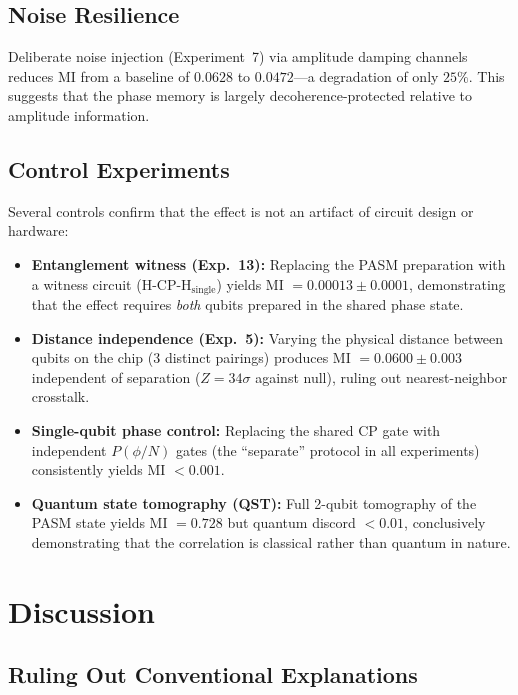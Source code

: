 ﻿\documentclass[12pt,a4paper]{article}
\begin{document}
\subsection{Noise Resilience}

Deliberate noise injection (Experiment~7) via amplitude damping channels reduces MI from a baseline of $0.0628$ to $0.0472$---a degradation of only $25\%$. This suggests that the phase memory is largely decoherence-protected relative to amplitude information.

\subsection{Control Experiments}

Several controls confirm that the effect is not an artifact of circuit design or hardware:

\begin{itemize}
\item \textbf{Entanglement witness (Exp.~13):} Replacing the PASM preparation with a witness circuit (H-CP-H$_{\text{single}}$) yields MI $= 0.00013 \pm 0.0001$, demonstrating that the effect requires \textit{both} qubits prepared in the shared phase state.
\item \textbf{Distance independence (Exp.~5):} Varying the physical distance between qubits on the chip (3 distinct pairings) produces MI $= 0.0600 \pm 0.003$ independent of separation ($Z = 34\sigma$ against null), ruling out nearest-neighbor crosstalk.
\item \textbf{Single-qubit phase control:} Replacing the shared CP gate with independent $P(\phi/N)$ gates (the ``separate'' protocol in all experiments) consistently yields MI $< 0.001$.
\item \textbf{Quantum state tomography (QST):} Full 2-qubit tomography of the PASM state yields MI $= 0.728$ but quantum discord $< 0.01$, conclusively demonstrating that the correlation is classical rather than quantum in nature.
\end{itemize}

\section{Discussion}
\label{sec:discussion}

\subsection{Ruling Out Conventional Explanations}
\end{document}
